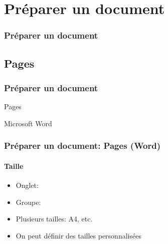 \documentclass[xcolor=table]{beamer}
\begin{document}
\section{Préparer un document}

\begin{frame}
\frametitle{Préparer un document}

\end{frame}

\subsection{Pages}

\begin{frame}
\frametitle{Préparer un document}

\begin{center}
	Pages 
	
	Microsoft Word
\end{center}

\end{frame}

\begin{frame}[t]
\frametitle{Préparer un document: Pages (Word)}
\framesubtitle{Taille}

\begin{minipage}{0.44\textwidth}
	\begin{itemize}
		\item Onglet: 
		\item Groupe: 
		\item Plusieurs tailles: A4, etc.
		\item On peut définir des tailles personnalisées
	\end{itemize}
\end{minipage}
\begin{minipage}{0.55\textwidth}
\end{minipage}

\end{frame}
\end{document}
